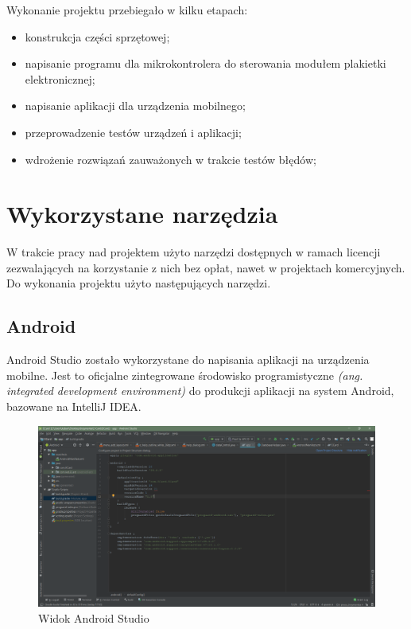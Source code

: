 \documentclass[a4paper,12pt, twoside]{article}
\begin{document}
    	\begin{flushleft}
    	Wykonanie projektu przebiegało w kilku etapach:
    	\begin{itemize}
    	    \item konstrukcja części sprzętowej;
    	    \item napisanie programu dla mikrokontrolera do sterowania modułem plakietki elektronicznej;
    	    \item napisanie aplikacji dla urządzenia mobilnego;
    	    \item przeprowadzenie testów urządzeń i aplikacji;
    	    \item wdrożenie rozwiązań zauważonych w trakcie testów błędów;
    	\end{itemize}
    	\end{flushleft}
 
        \newpage
    	\section{Wykorzystane narzędzia}
    	W trakcie pracy nad projektem użyto narzędzi dostępnych w ramach licencji zezwalających na korzystanie z nich bez opłat, nawet w projektach komercyjnych. Do wykonania projektu użyto następujących narzędzi.
    	
    	\subsection{Android}
    	Android Studio zostało wykorzystane do napisania aplikacji na urządzenia mobilne. Jest to oficjalne zintegrowane środowisko programistyczne \textit{(ang. integrated development environment)} \cite{ide} do produkcji aplikacji na system Android, bazowane na IntelliJ IDEA.
    	
    	\begin{figure}[H]
    	    \centering
    		\includegraphics[width=1\textwidth]{images/rys4_android.png}
    		\caption{Widok Android Studio}
            \label{fig:androidstudio}
    	\end{figure}
     	
\end{document}
